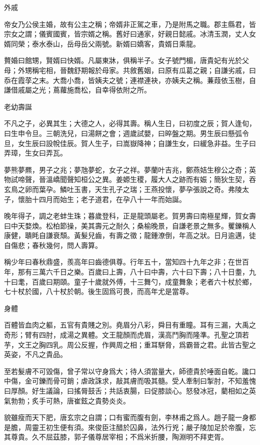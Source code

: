 \documentclass[12pt,a4paper]{ctexbook}
\begin{document}
外戚\par
帝女乃公侯主婚，故有公主之稱；帝婿非正駕之車，乃是附馬之職。郡主縣君，皆宗女之謂；儀賓國賓，皆宗婿之稱。舊好曰通家，好親日懿戚。冰清玉潤，丈人女婿同榮；泰水泰山，岳母岳父兩號。新婿曰嬌客，貴婿日乘龍。\par
贅婚曰館甥，賢婿曰快婿。凡屬東牀，俱稱半子。女子號門楣，唐貴妃有光於父母；外甥稱宅相，晉魏舒期報於母家。共敘舊姻，曰原有瓜葛之親；自謙劣戚，曰忝在霞莩之末。大喬小喬，皆姨夫之號；連襟連袂，亦姨夫之稱。蒹葭依玉樹，自謙借戚屬之光；蔦蘿施喬松，自幸得依附之所。\par
老幼壽誕\par
不凡之子，必異其生；大德之人，必得其壽。稱人生日，曰初度之辰；賀人逢旬，曰生申令旦。三朝洗兒，曰湯餅之會；週歲試嬰，曰晬盤之期。男生辰曰懸弧令旦，女生辰曰設帨佳辰。賀人生子，曰嵩嶽降神；自謙生女，曰緩急非益。生子曰弄璋，生女曰弄瓦。\par
夢熊夢羆，男子之兆；夢虺夢蛇，女子之祥。夢蘭叶吉兆，鄭燕姞生穆公之奇；英物試啼聲，晉溫嶠聞聲知桓公之異。姜嫄生稷，履大人之跡而有娠；簡狄生契，吞玄鳥之卵而葉孕。鱗吐玉書，天生孔子之瑞；王燕投懷，夢孕張說之奇。弗陵太子，懷胎十四月而始生；老子道君，在孕八十一年而始誕。\par
晚年得子，調之老蚌生珠；暮歲登科，正是龍頭屬老。賀男壽曰南極星輝，賀女壽曰中天婺煥。松柏節操，美其壽元之耐久；桑榆晚景，自謙老景之無多。矍鑠稱人康健，聵眊自謙衰頹。黃髮兒齒，有壽之徵；龍鍾潦倒，年高之狀。日月逾邁，徒自傷悲；春秋幾何，問人壽算。\par
稱少年曰春秋鼎盛，羨高年曰齒德俱尊。行年五十，當知四十九年之非；在世百年，那有三萬六千日之樂。百歲曰上壽，八十曰中壽，六十曰下壽；八十日耋，九十曰耄，百歲曰期頤。童子十歲就外傅，十三舞勺，成童舞象；老者六十杖於鄉，七十杖於國，八十杖於朝。後生固爲可畏，而高年尤是當尊。\par
身體\par
百體皆血肉之軀，五官有貴賤之別。堯眉分八彩，舜目有重瞳。耳有三漏，大禹之奇形；臂有四肘，成湯之異體。文王龍顏而虎眉，漢高鬥胸而隆準。孔聖之頂若芋，文王之胸四乳。周公反握，作興周之相；重耳駢脅，爲霸晉之君。此皆古聖之英姿，不凡之貴品。\par
至若髮膚不可毀傷，曾子常以守身爲大；待人須當量大，師德貴於唾面自乾。讒口中傷，金可鑠而骨可銷；虐政誅求，敲其膚而吸其髓。受人牽制曰掣肘，不知羞愧曰厚顏。好生議論，曰搖脣鼓舌；共話衷腸，曰促膝談心。怒發冰冠，藺相如之英氣勃勃；炙手可熱，唐崔鉉之貴勢炎炎。\par
貌雖瘦而天下肥，唐玄宗之自謂；口有蜜而腹有劍，李林甫之爲人。趙子龍一身都是膽，周靈王初生便有須。來俊臣注醋於囚鼻，法外行兇；嚴子陵加足於帝腹，忘其尊貴。久不屈茲膝，郭子儀尊居宰相；不爲米折腰，陶淵明不拜吏胥。\par
\end{document}
